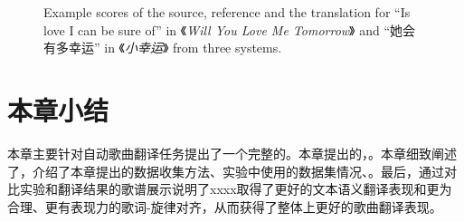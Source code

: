 \begin{figure}[t]
{}\\
\\
\caption{Example scores of the source, reference and the translation for ``Is love I can be sure of'' in 《\textit{Will You Love Me Tomorrow}》 and ``她会有多幸运'' in 《\textit{小幸运}》 from three systems.}
\label{fig:score_analysis}
\end{figure}
\section{本章小结}
本章主要针对自动歌曲翻译任务提出了一个完整的。本章提出的，。本章细致阐述了，介绍了本章提出的数据收集方法、实验中使用的数据集情况、。最后，通过对比实验和翻译结果的歌谱展示说明了xxxx取得了更好的文本语义翻译表现和更为合理、更有表现力的歌词-旋律对齐，从而获得了整体上更好的歌曲翻译表现。
